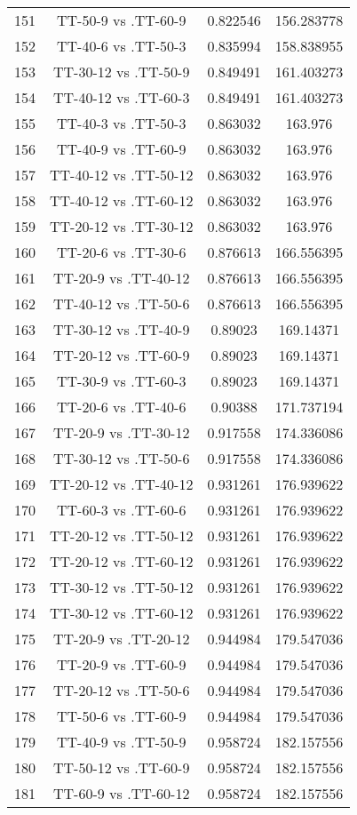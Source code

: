 \documentclass[a4paper,10pt]{article}
\begin{document}
\begin{landscape}
\begin{table}[!htp]
\begin{tabular}{cccc}
151&TT-50-9 vs .TT-60-9&0.822546&156.283778\\
152&TT-40-6 vs .TT-50-3&0.835994&158.838955\\
153&TT-30-12 vs .TT-50-9&0.849491&161.403273\\
154&TT-40-12 vs .TT-60-3&0.849491&161.403273\\
155&TT-40-3 vs .TT-50-3&0.863032&163.976\\
156&TT-40-9 vs .TT-60-9&0.863032&163.976\\
157&TT-40-12 vs .TT-50-12&0.863032&163.976\\
158&TT-40-12 vs .TT-60-12&0.863032&163.976\\
159&TT-20-12 vs .TT-30-12&0.863032&163.976\\
160&TT-20-6 vs .TT-30-6&0.876613&166.556395\\
161&TT-20-9 vs .TT-40-12&0.876613&166.556395\\
162&TT-40-12 vs .TT-50-6&0.876613&166.556395\\
163&TT-30-12 vs .TT-40-9&0.89023&169.14371\\
164&TT-20-12 vs .TT-60-9&0.89023&169.14371\\
165&TT-30-9 vs .TT-60-3&0.89023&169.14371\\
166&TT-20-6 vs .TT-40-6&0.90388&171.737194\\
167&TT-20-9 vs .TT-30-12&0.917558&174.336086\\
168&TT-30-12 vs .TT-50-6&0.917558&174.336086\\
169&TT-20-12 vs .TT-40-12&0.931261&176.939622\\
170&TT-60-3 vs .TT-60-6&0.931261&176.939622\\
171&TT-20-12 vs .TT-50-12&0.931261&176.939622\\
172&TT-20-12 vs .TT-60-12&0.931261&176.939622\\
173&TT-30-12 vs .TT-50-12&0.931261&176.939622\\
174&TT-30-12 vs .TT-60-12&0.931261&176.939622\\
175&TT-20-9 vs .TT-20-12&0.944984&179.547036\\
176&TT-20-9 vs .TT-60-9&0.944984&179.547036\\
177&TT-20-12 vs .TT-50-6&0.944984&179.547036\\
178&TT-50-6 vs .TT-60-9&0.944984&179.547036\\
179&TT-40-9 vs .TT-50-9&0.958724&182.157556\\
180&TT-50-12 vs .TT-60-9&0.958724&182.157556\\
181&TT-60-9 vs .TT-60-12&0.958724&182.157556\\

\end{tabular}
\end{table}
\end{landscape}
\end{document}
